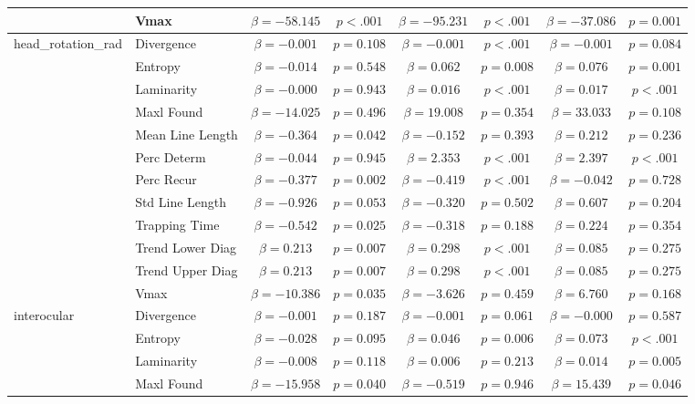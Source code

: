 \begin{tabular}{llcc|cc|cc}
 & Vmax & $\beta = -58.145$ & $p < .001$ & $\beta = -95.231$ & $p < .001$ & $\beta = -37.086$ & $p = 0.001$ \\
\midrule
\multirow{12}{*}{head_rotation_rad} & Divergence & $\beta = -0.001$ & $p = 0.108$ & $\beta = -0.001$ & $p < .001$ & $\beta = -0.001$ & $p = 0.084$ \\
 & Entropy & $\beta = -0.014$ & $p = 0.548$ & $\beta = 0.062$ & $p = 0.008$ & $\beta = 0.076$ & $p = 0.001$ \\
 & Laminarity & $\beta = -0.000$ & $p = 0.943$ & $\beta = 0.016$ & $p < .001$ & $\beta = 0.017$ & $p < .001$ \\
 & Maxl Found & $\beta = -14.025$ & $p = 0.496$ & $\beta = 19.008$ & $p = 0.354$ & $\beta = 33.033$ & $p = 0.108$ \\
 & Mean Line Length & $\beta = -0.364$ & $p = 0.042$ & $\beta = -0.152$ & $p = 0.393$ & $\beta = 0.212$ & $p = 0.236$ \\
 & Perc Determ & $\beta = -0.044$ & $p = 0.945$ & $\beta = 2.353$ & $p < .001$ & $\beta = 2.397$ & $p < .001$ \\
 & Perc Recur & $\beta = -0.377$ & $p = 0.002$ & $\beta = -0.419$ & $p < .001$ & $\beta = -0.042$ & $p = 0.728$ \\
 & Std Line Length & $\beta = -0.926$ & $p = 0.053$ & $\beta = -0.320$ & $p = 0.502$ & $\beta = 0.607$ & $p = 0.204$ \\
 & Trapping Time & $\beta = -0.542$ & $p = 0.025$ & $\beta = -0.318$ & $p = 0.188$ & $\beta = 0.224$ & $p = 0.354$ \\
 & Trend Lower Diag & $\beta = 0.213$ & $p = 0.007$ & $\beta = 0.298$ & $p < .001$ & $\beta = 0.085$ & $p = 0.275$ \\
 & Trend Upper Diag & $\beta = 0.213$ & $p = 0.007$ & $\beta = 0.298$ & $p < .001$ & $\beta = 0.085$ & $p = 0.275$ \\
 & Vmax & $\beta = -10.386$ & $p = 0.035$ & $\beta = -3.626$ & $p = 0.459$ & $\beta = 6.760$ & $p = 0.168$ \\
\midrule
\multirow{12}{*}{interocular} & Divergence & $\beta = -0.001$ & $p = 0.187$ & $\beta = -0.001$ & $p = 0.061$ & $\beta = -0.000$ & $p = 0.587$ \\
 & Entropy & $\beta = -0.028$ & $p = 0.095$ & $\beta = 0.046$ & $p = 0.006$ & $\beta = 0.073$ & $p < .001$ \\
 & Laminarity & $\beta = -0.008$ & $p = 0.118$ & $\beta = 0.006$ & $p = 0.213$ & $\beta = 0.014$ & $p = 0.005$ \\
 & Maxl Found & $\beta = -15.958$ & $p = 0.040$ & $\beta = -0.519$ & $p = 0.946$ & $\beta = 15.439$ & $p = 0.046$ \\

\end{tabular}
